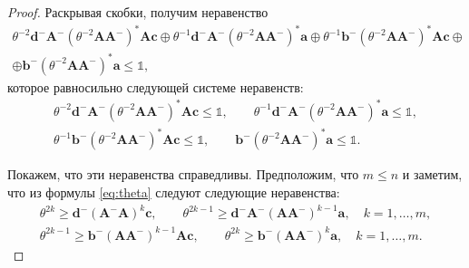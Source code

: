 \documentclass[specialist,
               substylefile = spbu.rtx,
               subf,href,colorlinks=true, 12pt]{disser}
\theoremstyle{definition}
\begin{document}
\begin{proof}
Раскрывая скобки, получим неравенство
\begin{multline}
\label{eq:req_u}
\theta^{-2}\bm{d}^{-}\bm{A}^{-}(\theta^{-2}\bm{A}\bm{A}^{-})^{\ast}\bm{A}\bm{c}
\oplus
\theta^{-1}\bm{d}^{-}\bm{A}^{-}(\theta^{-2}\bm{A}\bm{A}^{-})^{\ast}\bm{a}
\oplus
\theta^{-1}\bm{b}^{-}(\theta^{-2}\bm{A}\bm{A}^{-})^{\ast}\bm{A}\bm{c}
\oplus
\\
\oplus
\bm{b}^{-}(\theta^{-2}\bm{A}\bm{A}^{-})^{\ast}\bm{a}
\leq\mathbb{1},
\end{multline}
которое равносильно следующей системе неравенств:
\begin{equation*}
\begin{gathered}
\theta^{-2}\bm{d}^{-}\bm{A}^{-}(\theta^{-2}\bm{A}\bm{A}^{-})^{\ast}\bm{A}\bm{c}
\leq\mathbb{1},\qquad
\theta^{-1}\bm{d}^{-}\bm{A}^{-}(\theta^{-2}\bm{A}\bm{A}^{-})^{\ast}\bm{a}
\leq\mathbb{1},\\
\theta^{-1}\bm{b}^{-}(\theta^{-2}\bm{A}\bm{A}^{-})^{\ast}\bm{A}\bm{c}
\leq\mathbb{1},\qquad
\bm{b}^{-}(\theta^{-2}\bm{A}\bm{A}^{-})^{\ast}\bm{a}
\leq\mathbb{1}.
\end{gathered}
\end{equation*}

Покажем, что эти неравенства справедливы. Предположим, что $m\leq n$ %
 и заметим, что из формулы \eqref{eq:theta} следуют следующие неравенства:
\begin{gather*}
\theta^{2k}\geq\bm{d}^{-}(\bm{A}^{-}\bm{A})^{k}\bm{c},
\qquad
\theta^{2k-1}
\geq
\bm{d}^{-}\bm{A}^{-}(\bm{A}\bm{A}^{-})^{k-1}\bm{a},
\quad
k=1,\ldots,m,\\
\theta^{2k-1}
\geq
\bm{b}^{-}(\bm{A}\bm{A}^{-})^{k-1}\bm{A}\bm{c},
\qquad
\theta^{2k}
\geq
\bm{b}^{-}(\bm{A}\bm{A}^{-})^{k}\bm{a},
\quad
k=1,\ldots,m.
\end{gather*}



\end{proof}
\end{document}
